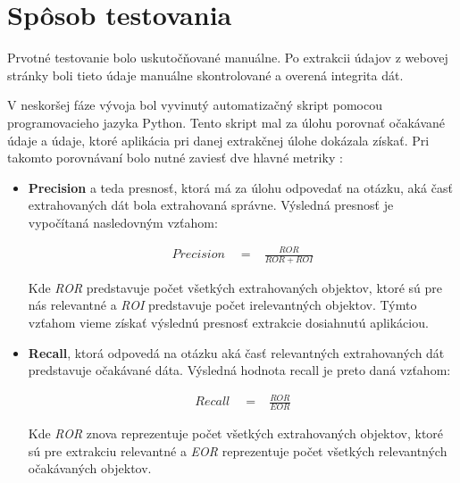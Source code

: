 \section{Spôsob testovania}
\label{sposobytestu}

Prvotné testovanie bolo uskutočňované manuálne. Po extrakcii údajov z webovej stránky boli tieto údaje manuálne skontrolované a overená integrita dát. 

V neskoršej fáze vývoja bol vyvinutý automatizačný skript pomocou programovacieho jazyka Python. Tento skript mal za úlohu porovnať očakávané údaje a údaje, ktoré aplikácia pri danej extrakčnej úlohe dokázala získať. Pri takomto porovnávaní bolo nutné zaviesť dve hlavné metriky \cite{precrecall}:

\begin{itemize}
    \item \textbf{Precision} a teda presnosť, ktorá má za úlohu odpovedať na otázku, aká časť extrahovaných dát bola extrahovaná správne. Výsledná presnosť je vypočítaná nasledovným vzťahom:
    
    \begin{eqnarray}
    \label{preeq}
    Precision \quad = & {\displaystyle\frac{ROR}{ROR + ROI}}
    \end{eqnarray}
   
    Kde \textit{ROR} predstavuje počet všetkých extrahovaných objektov, ktoré sú pre nás relevantné a \textit{ROI} predstavuje počet irelevantných objektov. Týmto vzťahom vieme získať výslednú presnosť extrakcie dosiahnutú aplikáciou.
    
    \item \textbf{Recall}, ktorá odpovedá na otázku aká časť relevantných extrahovaných dát predstavuje očakávané dáta. Výsledná hodnota recall je preto daná vzťahom:
    
    \begin{eqnarray}
    \label{receq}
    Recall \quad = & {\displaystyle\frac{ROR}{EOR}}
    \end{eqnarray}
    
    Kde \textit{ROR} znova reprezentuje počet všetkých extrahovaných objektov, ktoré sú pre extrakciu relevantné a \textit{EOR} reprezentuje počet všetkých relevantných očakávaných objektov.
\end{itemize}

\bigskip

